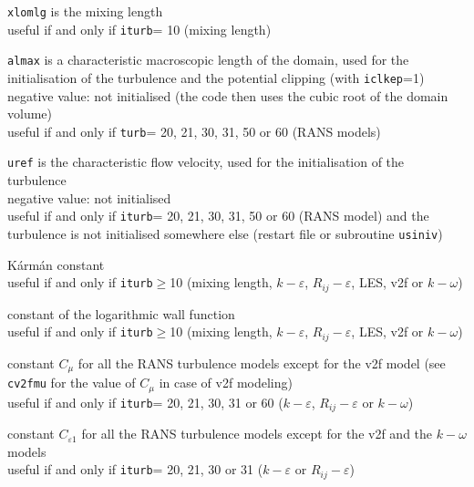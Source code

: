 {{\tt xlomlg} is the mixing length\\
useful if and only if {\tt iturb}= 10 (mixing length)}

{{\tt almax} is a characteristic macroscopic
length of the domain, used for the initialisation of the turbulence and
the potential clipping (with {\tt iclkep}=1)\\
negative value: not initialised (the code then uses the cubic root of
the domain volume)\\
useful if and only if {\tt turb}= 20, 21, 30, 31, 50 or 60 (RANS models)}

{{\tt uref} is the characteristic flow velocity,
used for the initialisation of the turbulence\\
negative value: not initialised\\
useful if and only if {\tt iturb}= 20, 21, 30, 31, 50 or 60 (RANS model)
and the turbulence is not initialised somewhere
else (restart file or subroutine \texttt{usiniv})}



{K\'arm\'an constant\\
useful if and only if {\tt iturb}$\geqslant$10
(mixing length, $k-\varepsilon$, $R_{ij}-\varepsilon$, LES, v2f or $k-\omega$)}

{constant of the logarithmic wall function\\
useful if and only if {\tt iturb}$\geqslant$10
(mixing length, $k-\varepsilon$, $R_{ij}-\varepsilon$, LES, v2f or $k-\omega$)}

{constant $C_\mu$ for all the RANS turbulence models except for the v2f model
(see {\tt cv2fmu} for the value of $C_\mu$ in case of v2f modeling)\\
useful if and only if {\tt iturb}= 20,
21, 30, 31 or 60 ($k-\varepsilon$, $R_{ij}-\varepsilon$ or $k-\omega$)}

{constant $C_{\varepsilon 1}$ for all the RANS turbulence models except
for the v2f and the $k-\omega$ models\\
useful if and only if {\tt iturb}= 20,
21, 30 or 31 ($k-\varepsilon$ or $R_{ij}-\varepsilon$)}

